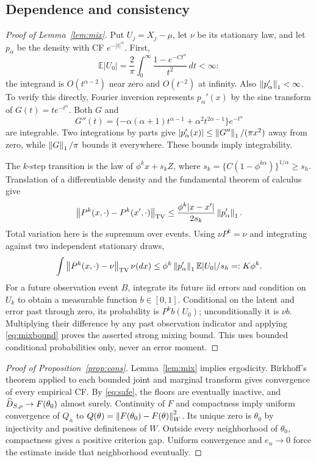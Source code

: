 \documentclass[11pt,a4paper]{article}
\theoremstyle{remark}\newtheorem{remark}[theorem]{Remark}
\newcommand{\E}{\mathbb E}\newcommand{\Pp}{\mathbb P}
\begin{document}
\subsection{Dependence and consistency}\label{proof:dependence}
\begin{proof}[Proof of Lemma~\ref{lem:mix}]
Put $U_j=X_j-\mu$, let $\nu$ be its stationary law, and let $p_\alpha$ be the density with CF $e^{-|t|^\alpha}$. First,
\[
\E|U_0|=\frac2\pi\int_0^\infty\frac{1-e^{-Ct^\alpha}}{t^2}\,dt<\infty:
\]
the integrand is $O(t^{\alpha-2})$ near zero and $O(t^{-2})$ at infinity. Also $\left\lVert p_\alpha'\right\rVert_1<\infty$. To verify this directly, Fourier inversion represents $p_\alpha'(x)$ by the sine transform of $G(t)=te^{-t^\alpha}$. Both $G$ and
\[
G''(t)=\{-\alpha(\alpha+1)t^{\alpha-1}+\alpha^2t^{2\alpha-1}\}e^{-t^\alpha}
\]
are integrable. Two integrations by parts give $|p_\alpha'(x)|\le\left\lVert G''\right\rVert_1/(\pi x^2)$ away from zero, while $\left\lVert G\right\rVert_1/\pi$ bounds it everywhere. These bounds imply integrability.

The $k$-step transition is the law of $\phi^k x+s_kZ$, where
$s_k=\{C(1-\phi^{k\alpha})\}^{1/\alpha}\ge s_h$.
Translation of a differentiable density and the fundamental theorem of calculus give
\[
\left\lVert P^k(x,\cdot)-P^k(x',\cdot)\right\rVert_{\rm TV}
\le\frac{\phi^k|x-x'|}{2s_k}\left\lVert p_\alpha'\right\rVert_1.
\]
Total variation here is the supremum over events. Using $\nu P^k=\nu$ and integrating against two independent stationary draws,
\begin{equation}\label{eq:mixbound}
\int\norm{P^k(x,\cdot)-\nu}_{\rm TV}\nu(dx)
\le \phi^k\norm{p_\alpha'}_1\E|U_0|/s_h=:K\phi^k.
\end{equation}
For a future observation event $B$, integrate its future iid errors and condition on $U_k$ to obtain a measurable function $b\in[0,1]$. Conditional on the latent and error past through zero, its probability is $P^kb(U_0)$; unconditionally it is $\nu b$. Multiplying their difference by any past observation indicator and applying \eqref{eq:mixbound} proves the asserted strong mixing bound. This uses bounded conditional probabilities only, never an error moment.
\end{proof}

\begin{proof}[Proof of Proposition~\ref{prop:cons}]
Lemma~\ref{lem:mix} implies ergodicity. Birkhoff's theorem applied to each bounded joint and marginal transform gives convergence of every empirical CF. By \eqref{eq:safe}, the floors are eventually inactive, and $\widehat D_{S,\rho}\to F(\theta_0)$ almost surely. Continuity of $F$ and compactness imply uniform convergence of $Q_n$ to
$Q(\theta)=\left\lVert F(\theta_0)-F(\theta)\right\rVert_W^2$. Its unique zero is $\theta_0$ by injectivity and positive definiteness of $W$. Outside every neighborhood of $\theta_0$, compactness gives a positive criterion gap. Uniform convergence and $e_n\to0$ force the estimate inside that neighborhood eventually.
\end{proof}
\end{document}
